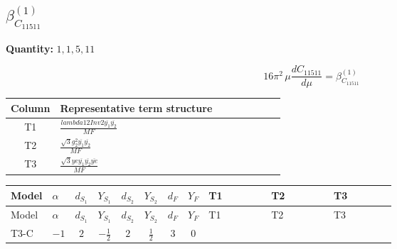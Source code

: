\documentclass[8pt]{article}
\begin{document}
\begin{landscape}
\section*{$\beta_{C_{11511}}^{(1)}$}
\noindent\textbf{Quantity: }$\mathrm{1,1,5,11}$\par\smallskip
\[16\pi^2\,\mu\frac{d C_{11511}}{d\mu}=\beta_{C_{11511}}^{(1)}\]
\begin{center}
\begin{tabular}{@{}c >{\raggedright\arraybackslash}p{0.82\linewidth}@{}}
\toprule
Column & Representative term structure \\
\midrule
T1 & \(\displaystyle \frac{lambda12Inv2 \overline{y_{1}} \overline{y_{2}}}{MF}\) \\
\midrule
T2 & \(\displaystyle \frac{\sqrt{3} g_{2}^{2} \overline{y_{1}} \overline{y_{2}}}{MF}\) \\
\midrule
T3 & \(\displaystyle \frac{\sqrt{3} ye \overline{y_{1}} \overline{y_{2}} \overline{ye}}{MF}\) \\
\midrule
\bottomrule
\end{tabular}
\end{center}
\smallskip
\tiny
\begin{longtable}{@{}llcccccc >{\raggedright\arraybackslash}p{0.21\linewidth} >{\raggedright\arraybackslash}p{0.21\linewidth} >{\raggedright\arraybackslash}p{0.21\linewidth}@{}}
\toprule
Model & $\alpha$ & $d_{S_1}$ & $Y_{S_1}$ & $d_{S_2}$ & $Y_{S_2}$ & $d_F$ & $Y_F$ & T1 & T2 & T3 \\
\midrule
\endfirsthead
\toprule
Model & $\alpha$ & $d_{S_1}$ & $Y_{S_1}$ & $d_{S_2}$ & $Y_{S_2}$ & $d_F$ & $Y_F$ & T1 & T2 & T3 \\
\midrule
\endhead
T3-C & $-1$ & $2$ & $-\frac{1}{2}$ & $2$ & $\frac{1}{2}$ & $3$ & $0$ & \scriptsize\adjustbox{max width=\linewidth}{$\begin{gathered} \frac{lambda12Inv2 \overline{y_{1}} \overline{y_{2}}}{3 MF}\end{gathered}$} & \scriptsize\adjustbox{max width=\linewidth}{$\begin{gathered} \frac{\sqrt{3} g_{2}^{2} \overline{y_{1}} \overline{y_{2}}}{4 MF}\end{gathered}$} & \scriptsize\adjustbox{max width=\linewidth}{$\begin{gathered} - \frac{\sqrt{3} ye \overline{y_{1}} \overline{y_{2}} \overline{ye}}{12 MF}\end{gathered}$} \\
\midrule
\bottomrule
\end{longtable}
\clearpage

\end{landscape}
\end{document}

